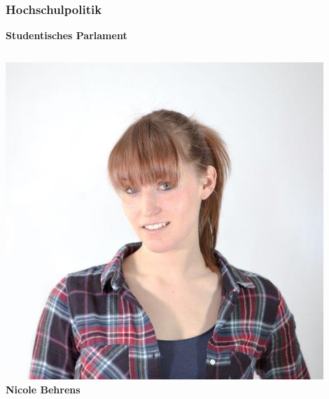 \documentclass{beamer}
\begin{document}
    \begin{frame}[t]
    	\frametitle{Hochschulpolitik}
    	\textbf{Studentisches Parlament}
    	\bigskip
    	\begin{columns}[t]
    		\includegraphics[width=0.9\textwidth]{nicole.jpg}
    		\\
    		\textbf{Nicole Behrens}
    	\end{columns}
    \end{frame}
    
\end{document}
